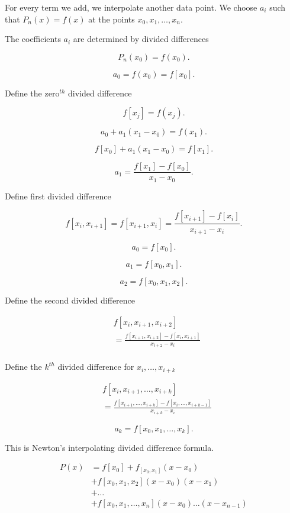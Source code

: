 \documentclass[12pt]{article}
\begin{document}
For every term we add, we interpolate another data point. We choose $a_i$ such
that $P_n(x) = f(x)$ at the points $x_0, x_1, \dots, x_n$.

The coefficients $a_i$ are determined by divided differences

\[
P_n (x_0) = f(x_0)
.\]

\[
  a_0 = f(x_0) = f[x_0]
.\]

Define the zero$^{th}$ divided difference

\[
  f[x_j] = f(x_j)
.\]

\[
a_0 + a_1(x_1-x_0) = f(x_1)
.\]

\[
  f[x_0] + a_1 (x_1-x_0) = f[x_1]
.\]

\[
a_1 = \frac{f[x_1] - f[x_0]}{x_1-x_0}
.\]

Define first divided difference

\[
  f[x_i, x_{i+1}] = f[x_{i+1}, x_i] = \frac{f[x_{i+1}]-f[x_i]}{x_{i+1}-x_i}
.\]

\[
  a_0 = f[x_0]
.\]

\[
  a_1 = f[x_0, x_1]
.\]

\[
  a_2 = f[x_0, x_1, x_2]
.\]

Define the second divided difference

\begin{align*}
  &f[x_i, x_{i+1}, x_{i+2}] \\
  &= \frac{f[x_{i+1}, x_{i+2}] - f[x_i, x_{i+1}]}{x_{i+2}-x_i} \\
\end{align*}

Define the $k^{th}$ divided difference for $x_i, \dots, x_{i+k}$

\begin{align*}
  &f[x_i, x_{i+1}, \dots, x_{i+k}] \\
  &= \frac{f[x_{i+1}, \dots, x_{i+k}] - f[x_i, \dots, x_{i+k-1}]}{x_{i+k}-x_i} 
\end{align*}

\[
  a_k = f[x_0, x_1, \dots, x_k]
.\]

This is Newton's interpolating divided difference formula.


\begin{align*}
  P(x) &= f[x_0] + f_[x_0, x_1] (x-x_0) \\
       &+ f[x_0, x_1, x_2] (x-x_0) (x-x_1) \\
       &+ \dots \\
       &+ f[x_0, x_1, \dots, x_n](x-x_0) \dots (x-x_{n-1})
\end{align*}
\end{document}
